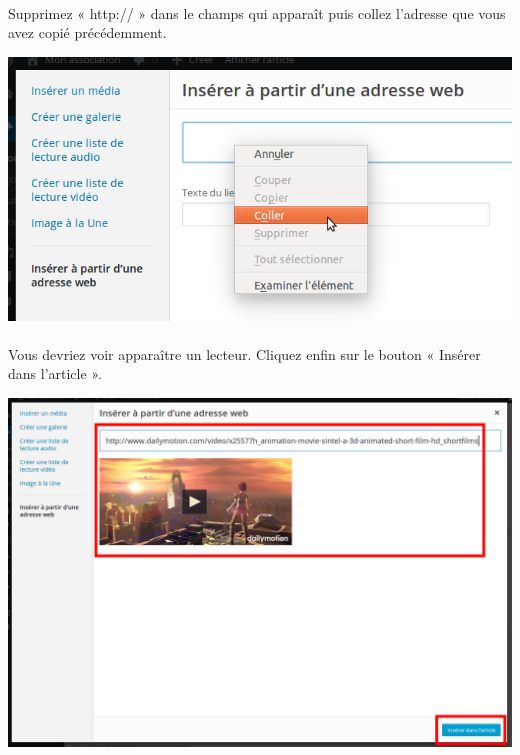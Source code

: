 \documentclass[10pt,a4paper]{article}
\begin{document}
\paragraph{}Supprimez « http:// » dans le champs qui apparaît puis collez l'adresse que vous avez copié précédemment.
\begin{center}
\includegraphics[scale=0.3]{img/0134.png}
\end{center}
\paragraph{}Vous devriez voir apparaître un lecteur. Cliquez enfin sur le bouton « Insérer dans l'article ».
\begin{center}
\includegraphics[scale=0.25]{img/0138.png}
\end{center}
\end{document}
